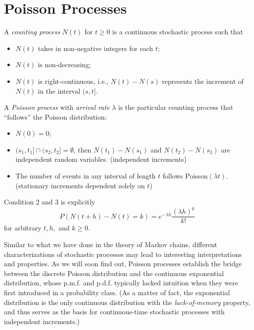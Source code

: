 \documentclass[11pt]{article}
\begin{document}
\section{Poisson Processes}

A \textit{counting process} $N(t)$ for $t\geq 0$ is a continuous stochastic process such that

\begin{itemize}

\item $N(t)$ takes in non-negative integers for each $t$;

\item $N(t)$ is non-decreasing;

\item $N(t)$ is right-continuous, i.e., $N(t)- N(s)$ represents the increment of $N(t)$ in the interval $(s,t]$.

\end{itemize}

A \textit{Poisson process} with \textit{arrival rate} $\lambda $ is the particular counting process that “follows” the Poisson distribution:

\begin{itemize}

\item $N(0)=0$;

\item $(s_{1},t_{1}]\cap (s_{2},t_{2}]= \emptyset$, then $N(t_{1})- N(s_{1})$ and $N(t_{2})- N(s_{2})$ are independent random variables. (independent increments)

\item The number of events in any interval of length $t$ follows Poisson$(\lambda t)$. (stationary increments dependent solely on $t$)

\end{itemize}

Condition 2 and 3 is explicitly
\[
P(N(t+h)- N(t)=k)=e^{-\lambda h}\frac{(\lambda h)^{k}}{k!}
\]
for arbitrary $t,h,$ and $k\geq 0$.

Similar to what we have done in the theory of Markov chains, different characterizations of stochastic processes may lead to interesting interpretations and properties. As we will soon find out, Poisson processes establish the bridge between the discrete Poisson distribution and the continuous exponential distribution, whose p.m.f. and p.d.f. typically lacked intuition when they were first introduced in a probability class. (As a matter of fact, the exponential distribution is the only continuous distribution with the \textit{lack-of-memory} property, and thus serves as the basis for continuous-time stochastic processes with independent increments.)
\end{document}
